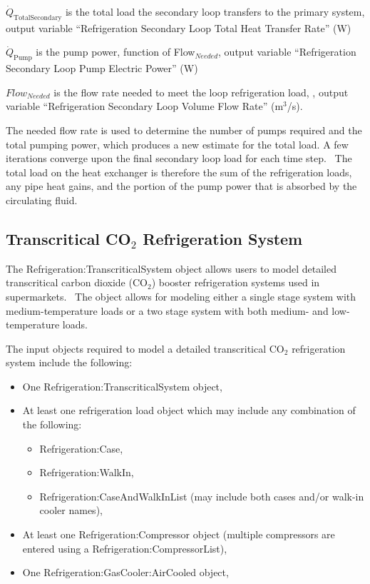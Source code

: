 \({\dot Q_{{\mathrm{TotalSecondary}}}}\) is the total load the secondary loop transfers to the primary system, output variable ``Refrigeration Secondary Loop Total Heat Transfer Rate'' (W)

\({\dot Q_{{\mathrm{Pump}}}}\) is the pump power, function of Flow\(_{Needed}\), output variable ``Refrigeration Secondary Loop Pump Electric Power'' (W)

\(Flow_{Needed}\) is the flow rate needed to meet the loop refrigeration load, , output variable ``Refrigeration Secondary Loop Volume Flow Rate'' (m\(^3\)/s).

The needed flow rate is used to determine the number of pumps required and the total pumping power, which produces a new estimate for the total load. A few iterations converge upon the final secondary loop load for each time step.~ The total load on the heat exchanger is therefore the sum of the refrigeration loads, any pipe heat gains, and the portion of the pump power that is absorbed by the circulating fluid.

\subsection{Transcritical CO\texorpdfstring{\(_{2}\)}{2} Refrigeration System}\label{transcritical-co2-refrigeration-system}

The Refrigeration:TranscriticalSystem object allows users to model detailed transcritical carbon dioxide (CO\(_{2}\)) booster refrigeration systems used in supermarkets.~ The object allows for modeling either a single stage system with medium-temperature loads or a two stage system with both medium- and low-temperature loads.

The input objects required to model a detailed transcritical CO\(_{2}\) refrigeration system include the following:

\begin{itemize}
  \item One Refrigeration:TranscriticalSystem object,
  \item At least one refrigeration load object which may include any combination of the following:
  \begin{itemize}
    \item Refrigeration:Case,
    \item Refrigeration:WalkIn,
    \item Refrigeration:CaseAndWalkInList (may include both cases and/or walk-in cooler names),
  \end{itemize}
  \item At least one Refrigeration:Compressor object (multiple compressors are entered using a Refrigeration:CompressorList),
  \item One Refrigeration:GasCooler:AirCooled object,
\end{itemize}

